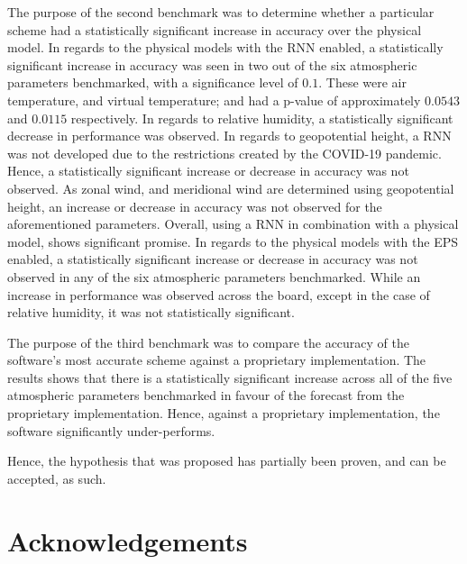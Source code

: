 \documentclass[hidelinks, 12pt]{style}
\begin{document}
The purpose of the second benchmark was to determine whether a particular scheme had a statistically significant increase in accuracy over the physical model. In regards to the physical models with the RNN enabled, a statistically significant increase in accuracy was seen in two out of the six atmospheric parameters benchmarked, with a significance level of $0.1$. These were air temperature, and virtual temperature; and had a p-value of approximately $0.0543$ and $0.0115$ respectively. In regards to relative humidity, a statistically significant decrease in performance was observed. In regards to geopotential height, a RNN was not developed due to the restrictions created by the COVID-19 pandemic. Hence, a statistically significant increase or decrease in accuracy was not observed. As zonal wind, and meridional wind are determined using geopotential height, an increase or decrease in accuracy was not observed for the aforementioned parameters. Overall, using a RNN in combination with a physical model, shows significant promise. In regards to the physical models with the EPS enabled, a statistically significant increase or decrease in accuracy was not observed in any of the six atmospheric parameters benchmarked. While an increase in performance was observed across the board, except in the case of relative humidity, it was not statistically significant.

The purpose of the third benchmark was to compare the accuracy of the software's most accurate scheme against a proprietary implementation. The results shows that there is a statistically significant increase across all of the five atmospheric parameters benchmarked in favour of the forecast from the proprietary implementation. Hence, against a proprietary implementation, the software significantly under-performs. 

Hence, the hypothesis that was proposed has partially been proven, and can be accepted, as such.

\chapter*{Acknowledgements}


\tableofcontents

\listoffigures

\mbox{}
\end{document}
